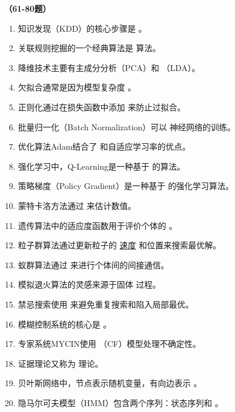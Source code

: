 \vspace{1em}
\textbf{（61-80题）}
\begin{enumerate}[resume,leftmargin=2em,itemsep=1pt]
\item 知识发现（KDD）的核心步骤是 \underline{\hspace{3em}}。
\item 关联规则挖掘的一个经典算法是 \underline{\hspace{3em}} 算法。
\item 降维技术主要有主成分分析（PCA）和 \underline{\hspace{3em}}（LDA）。
\item 欠拟合通常是因为模型复杂度 \underline{\hspace{3em}}。
\item 正则化通过在损失函数中添加 \underline{\hspace{3em}} 来防止过拟合。
\item 批量归一化（Batch Normalization）可以 \underline{\hspace{3em}} 神经网络的训练。
\item 优化算法Adam结合了 \underline{\hspace{3em}} 和自适应学习率的优点。
\item 强化学习中，Q-Learning是一种基于 \underline{\hspace{3em}} 的算法。
\item 策略梯度（Policy Gradient）是一种基于 \underline{\hspace{3em}} 的强化学习算法。
\item 蒙特卡洛方法通过 \underline{\hspace{3em}} 来估计数值。
\item 遗传算法中的适应度函数用于评价个体的 \underline{\hspace{3em}}。
\item 粒子群算法通过更新粒子的 \underline{速度} 和位置来搜索最优解。
\item 蚁群算法通过 \underline{\hspace{3em}} 来进行个体间的间接通信。
\item 模拟退火算法的灵感来源于固体 \underline{\hspace{3em}} 过程。
\item 禁忌搜索使用 \underline{\hspace{3em}} 来避免重复搜索和陷入局部最优。
\item 模糊控制系统的核心是 \underline{\hspace{3em}}。
\item 专家系统MYCIN使用 \underline{\hspace{3em}}（CF）模型处理不确定性。
\item 证据理论又称为 \underline{\hspace{3em}} 理论。
\item 贝叶斯网络中，节点表示随机变量，有向边表示 \underline{\hspace{3em}}。
\item 隐马尔可夫模型（HMM）包含两个序列：状态序列和 \underline{\hspace{3em}}。
\end{enumerate}

